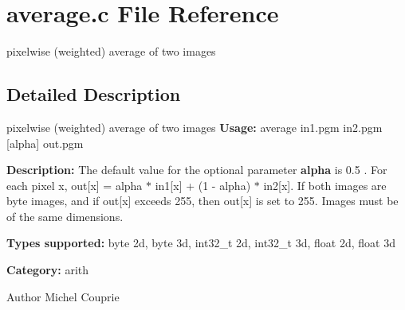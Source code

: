 \section{average.c File Reference}
\label{average_8c}


pixelwise (weighted) average of two images  




\subsection{Detailed Description}
pixelwise (weighted) average of two images {\bfseries Usage:} average in1.pgm in2.pgm [alpha] out.pgm

{\bfseries Description:} The default value for the optional parameter {\bfseries alpha} is 0.5 . For each pixel x, out[x] = alpha $\ast$ in1[x] + (1 -\/ alpha) $\ast$ in2[x]. If both images are byte images, and if out[x] exceeds 255, then out[x] is set to 255. Images must be of the same dimensions.

{\bfseries Types supported:} byte 2d, byte 3d, int32\_\-t 2d, int32\_\-t 3d, float 2d, float 3d

{\bfseries Category:} arith

\begin{DoxyAuthor}{Author}
Michel Couprie 
\end{DoxyAuthor}
